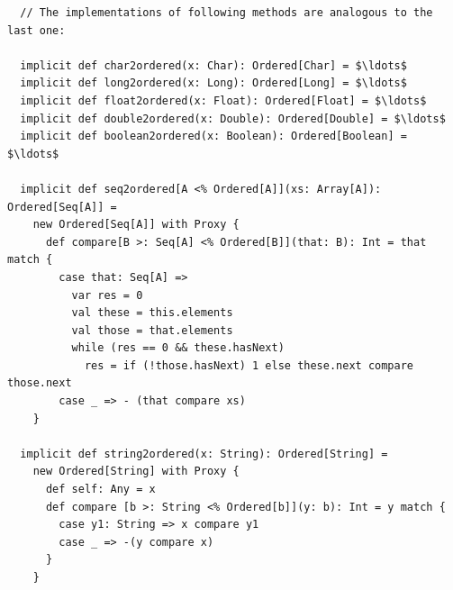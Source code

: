 \begin{lstlisting}
  // The implementations of following methods are analogous to the last one:

  implicit def char2ordered(x: Char): Ordered[Char] = $\ldots$ 
  implicit def long2ordered(x: Long): Ordered[Long] = $\ldots$ 
  implicit def float2ordered(x: Float): Ordered[Float] = $\ldots$
  implicit def double2ordered(x: Double): Ordered[Double] = $\ldots$
  implicit def boolean2ordered(x: Boolean): Ordered[Boolean] = $\ldots$

  implicit def seq2ordered[A <% Ordered[A]](xs: Array[A]): Ordered[Seq[A]] = 
    new Ordered[Seq[A]] with Proxy {
      def compare[B >: Seq[A] <% Ordered[B]](that: B): Int = that match {
        case that: Seq[A] =>
          var res = 0
          val these = this.elements
          val those = that.elements
          while (res == 0 && these.hasNext)
            res = if (!those.hasNext) 1 else these.next compare those.next
        case _ => - (that compare xs)
    }

  implicit def string2ordered(x: String): Ordered[String] = 
    new Ordered[String] with Proxy {
      def self: Any = x
      def compare [b >: String <% Ordered[b]](y: b): Int = y match {
        case y1: String => x compare y1
        case _ => -(y compare x)
      }
    }
\end{lstlisting}
\newpage
